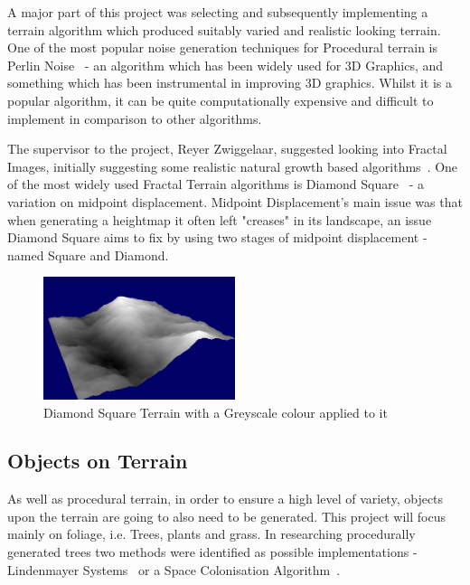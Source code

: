 \documentclass[a4paper,10pt]{report}
\begin{document}
A major part of this project was selecting and subsequently implementing a terrain algorithm which produced suitably varied and realistic looking terrain. One of the most popular noise generation techniques for Procedural terrain is Perlin Noise~\cite{perlin2002improving} - an algorithm which has been widely used for 3D Graphics, and something which has been instrumental in improving 3D graphics. Whilst it is a popular algorithm, it can be quite computationally expensive and difficult to implement in comparison to other algorithms.\medskip

The supervisor to the project, Reyer Zwiggelaar, suggested looking into Fractal Images, initially suggesting some realistic natural growth based algorithms~\cite{Bilsborough3424}. One of the most widely used Fractal Terrain algorithms is Diamond Square~\cite{olsen2004realtime} - a variation on midpoint displacement. Midpoint Displacement's main issue was that when generating a heightmap it often left "creases" in its landscape, an issue Diamond Square aims to fix by using two stages of midpoint displacement - named Square and Diamond.  \medskip

\begin{figure}[h!]
    \centering
  \includegraphics[width=0.5\textwidth]{DiamondSquareGreyScale}
 \caption{Diamond Square Terrain with a Greyscale colour applied to it}
 \label{fig:DiamondSquareGrey}
\end{figure}

\subsection{Objects on Terrain}

As well as procedural terrain, in order to ensure a high level of variety, objects upon the terrain are going to also need to be generated. This project will focus mainly on foliage, i.e. Trees, plants and grass. In researching procedurally generated trees two methods were identified as possible implementations - Lindenmayer Systems~\cite{lindenmayer2017} or a Space Colonisation Algorithm~\cite{runions2007modeling}. 
\end{document}
